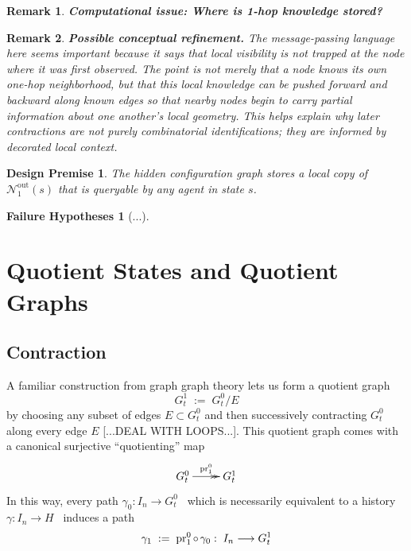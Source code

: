 \documentclass[11pt]{article}
\newtheorem{remark}{Remark}[subsection]
\newtheorem{premise}{Design Premise}
\newtheorem{failure}{Failure Hypotheses}
\begin{document}
\begin{remark}
{\bf Computational issue: Where is 1-hop knowledge stored?}
\normalfont
[...]
\end{remark}

{\color{blue}
\begin{remark}
{\bf Possible conceptual refinement.}
\normalfont
The message-passing language here seems important because it says that local visibility is not trapped at the node where it was first observed. The point is not merely that a node knows its own one-hop neighborhood, but that this local knowledge can be pushed forward and backward along known edges so that nearby nodes begin to carry partial information about one another's local geometry. This helps explain why later contractions are not purely combinatorial identifications; they are informed by decorated local context.
\end{remark}
}

\begin{premise}
The hidden configuration graph stores a local copy of $\mathcal{N}^{\text{out}\!}_{1}(s)$ that is queryable by any agent in state $s$.
\end{premise}

\begin{failure}
[...]
\end{failure}

\section{Quotient States and Quotient Graphs}

\subsection{Contraction}

A familiar construction from graph graph theory lets us form a quotient graph
$$
G^{1}_{t}\;:=\;G^{0}_{t}/E
$$
by choosing any subset of edges $E\subset G^{0}_{t}$ and then successively contracting $G^{0}_{t}$ along every edge $E$ [...DEAL WITH LOOPS...]. This quotient graph comes with a canonical surjective ``quotienting'' map
$$
\begin{xy}
(0,0)*+{G^{0}_{t}}="1";
(15,0)*+{G^{1}_{t}}="2";
{\ar@{->>}^{\text{pr}^{0}_{1}} "1"; "2"}
\end{xy}
$$
In this way, every path $\gamma_{0}:I_{n}\longrightarrow G^{0}_{t}$ \textemdash\ which is necessarily equivalent to a history $\gamma:I_{n}\longrightarrow H$ \textemdash\ induces a path
$$
\gamma_{1}\;:=\;\text{pr}^{0}_{1}{\small\ \!\circ\ \!}\gamma_0:\; I_{n}\longrightarrow G^{1}_{t}
$$
\end{document}
